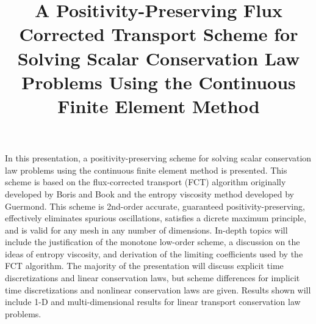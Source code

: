 \documentclass{article}
\title{A Positivity-Preserving Flux Corrected Transport Scheme for Solving
Scalar Conservation Law Problems Using the Continuous Finite Element Method}
\begin{document}
\maketitle

In this presentation, a positivity-preserving scheme for solving scalar
conservation law problems using the continuous finite element method
is presented. This scheme is based on the flux-corrected transport (FCT)
algorithm originally developed by Boris and Book and the entropy viscosity
method developed by Guermond. This scheme is 2nd-order accurate,
guaranteed positivity-preserving, effectively eliminates spurious
oscillations, satisfies a dicrete maximum principle, and is valid
for any mesh in any number of dimensions. In-depth topics will include
the justification of the monotone low-order scheme, a discussion on the
ideas of entropy viscosity, and derivation of the limiting coefficients
used by the FCT algorithm. The majority of the presentation will
discuss explicit time discretizations and linear conservation laws,
but scheme differences for implicit time discretizations and nonlinear
conservation laws are given. Results shown will include 1-D and multi-dimensional
results for linear transport conservation law problems.
\end{document}
